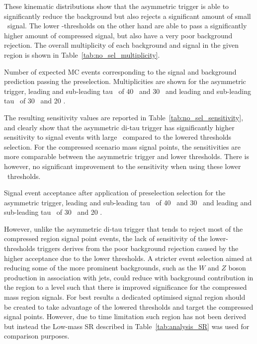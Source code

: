 	\NoSelectionTTTrigger
 	 These kinematic distributions show that the asymmetric trigger is able to significantly reduce the background but also rejects a significant amount of small \dm\ signal. The lower \pt -thresholds on the other hand are able to pass a significantly higher amount of compressed signal, but also have a very poor background rejection. The overall multiplicity of each background and signal in the given region is shown in Table~\ref{tab:no_sel_multiplicity}. 
 	 \begin{table}[!hbt]
	\centering
	\caption{Number of expected \ac{MC} events corresponding to the signal and background prediction passing the preselection. Multiplicities are shown for the asymmetric trigger, leading and sub-leading tau \pt\ of 40 \gev\ and 30 \gev\, and leading and sub-leading tau \pt\ of 30 \gev\ and 20 \gev.}
		
	\label{tab:no_sel_multiplicity}
	\end{table}
 	 The resulting sensitivity values are reported in Table~\ref{tab:no_sel_sensitivity}, and clearly show that the asymmetric di-tau trigger has significantly higher sensitivity to signal events with large \dm\ compared to the lowered thresholds selection. 
 	 For the compressed scenario mass signal points, the sensitivities are more comparable between the asymmetric trigger and lower thresholds. There is however, no significant improvement to the sensitivity when using these lower \pt\ thresholds.
 	  \begin{table}[!hbt]
	\centering
	\caption{Signal event acceptance after application of preselection selection for the asymmetric trigger, leading and sub-leading tau \pt\ of 40 \gev\ and 30 \gev\, and leading and sub-leading tau \pt\ of 30 \gev\ and 20 \gev.}
		
	\label{tab:no_sel_sensitivity}
	\end{table}
 	 However, unlike the asymmetric di-tau trigger that tends to reject most of the compressed region signal point events,  the lack of sensitivity of the lower-thresholds triggers derives from the poor background rejection caused by the higher acceptance due to the lower thresholds. 
 	 A stricter event selection aimed at reducing some of the more prominent backgrounds, such as the $W$ and $Z$ boson production in association with jets, could reduce with background contribution in the region to a level such that there is improved significance for the compressed mass region signals. 
 	 For best results a dedicated optimised signal region should be created to take advantage of the lowered thresholds and target the compressed signal points. However, due to time limitation such region has not been derived but instead the Low-mass \ac{SR} described in Table~\ref{tab:analysis_SR} was used for comparison purposes. 
